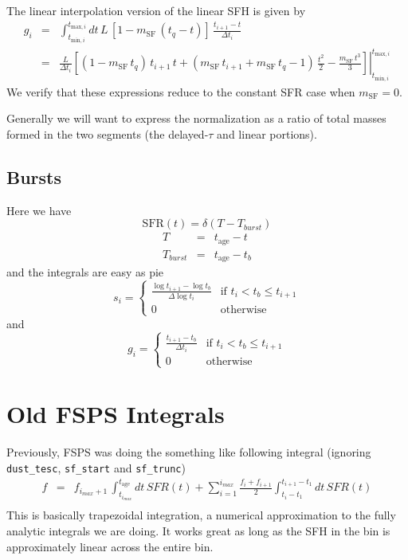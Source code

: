 \documentclass[12pt, letterpaper, preprint]{aastex}
\newcommand{\tmin}[1][]{t_{\mathrm{min} #1}}
\newcommand{\tmax}[1][]{t_{\mathrm{max} #1}}
\newcommand{\dlt}{\Delta\log t_i}
\newcommand{\dt}{\Delta t_i}
\newcommand{\tintegral}{\int_{\tmin[,i]}^{\tmax[,i]} dt}
\newcommand{\tinterval}{\right|_{\tmin[,i]}^{\tmax[,i]}}
\newcommand{\tage}{t_{\mathrm{age}}}
\newcommand{\sfslope}{m_{\mathrm{SF}}}
\begin{document}
The linear interpolation version of the linear SFH is given by 
\begin{eqnarray}
g_i  & = & \tintegral \,  L\, \left[1 - \sfslope \, (t_q - t)\right] \, \frac{t_{i+1} - t}{\dt}  \nonumber \\
      & = & \frac{L}{\dt} \left.\left[(1-\sfslope\, t_q) \, t_{i+1} \, t + \left(\sfslope\, t_{i+1} + \sfslope \, t_q -1\right)\, \frac{t^2}{2} - \frac{\sfslope\, t^3}{3}\right] \tinterval
\end{eqnarray}
We verify that these expressions reduce to the constant SFR case when $\sfslope=0$.

Generally we will want to express the normalization as a ratio of total masses formed in the two segments (the delayed-$\tau$ and linear portions).

\subsection{Bursts}

Here we have 
\[ 
\mathrm{SFR}(t) = \delta(T - T_{burst})
\]
\begin{eqnarray}
T & = & \tage - t \nonumber \\
T_{burst} & = & \tage - t_b
\end{eqnarray}
and the integrals are easy as pie
\[ 
s_i = 
\begin{cases}
\frac{\log t_{i+1} - \log t_b}{\dlt}&  \text{if } t_i < t_b \leq t_{i+1} \\
0 & \text{otherwise}
\end{cases}
\]
and
\[ 
g_i = 
\begin{cases}
\frac{t_{i+1} - t_b}{\dt}&  \text{if } t_i < t_b \leq t_{i+1} \\
0 & \text{otherwise}
\end{cases}
\]



\section{Old FSPS Integrals}

Previously, FSPS was doing the something like following integral (ignoring \texttt{dust\_tesc}, \texttt{sf\_start} and \texttt{sf\_trunc})
\begin{eqnarray}
f & = & f_{i_{max}+1} \, \int _{t_{i_{max}}}^{\tage} dt\, SFR(t) + \sum_{i=1}^{i_{max}} \frac{f_i + f_{i+1}}{2}\int _{t_{i}-t_1}^{t_{i+1}-t_1} dt\, SFR(t) \\
\end{eqnarray}
This is basically trapezoidal integration, a numerical approximation to the fully analytic integrals we are doing.  
It works great as long as the SFH in the bin is approximately linear across the entire bin.
\end{document}
